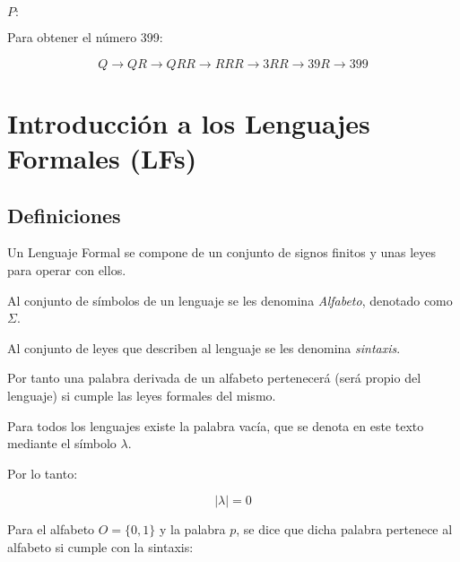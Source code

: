 {\hspace{5mm}  $P:$

\hspace{10mm} %

\hspace{10mm} %

\vspace{5mm}

Para obtener el número 399: 



\begin{equation}
Q \rightarrow QR \rightarrow QRR \rightarrow RRR \rightarrow 3RR \rightarrow 39R
\rightarrow 399
\end{equation}


\section{Introducción a los Lenguajes Formales (LFs)}

\subsection{Definiciones}

 Un Lenguaje Formal se compone de un conjunto de signos finitos y unas
leyes para operar con ellos.

 Al conjunto de símbolos de un lenguaje se les denomina \textit{Alfabeto},
denotado como $\Sigma$.

 Al conjunto de leyes que describen al lenguaje se les denomina
\textit{sintaxis}.

{\cor Por tanto una palabra derivada de un alfabeto pertenecerá (será propio del
lenguaje) si cumple las leyes formales del mismo.}

 Para todos los lenguajes existe la palabra vacía, que se denota en este
texto mediante el símbolo $\lambda$.

{\cor Por lo tanto:

\begin{equation}
|\lambda| = 0
\end{equation}

}



\ejem Para el alfabeto $O = \{0,1\}$ y la palabra $p$, se dice
que dicha palabra pertenece al alfabeto si cumple con la sintaxis:

}
